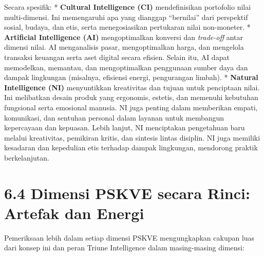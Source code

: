 \documentclass[
  letterpaper,
  DIV=11,
  numbers=noendperiod]{scrreprt}
\begin{document}
Secara spesifik: * \textbf{Cultural Intelligence (CI)} mendefinisikan
portofolio nilai multi-dimensi. Ini memengaruhi apa yang dianggap
``bernilai'' dari perspektif sosial, budaya, dan etis, serta
menegosiasikan pertukaran nilai non-moneter. * \textbf{Artificial
Intelligence (AI)} mengoptimalkan konversi dan \emph{trade-off} antar
dimensi nilai. AI menganalisis pasar, mengoptimalkan harga, dan
mengelola transaksi keuangan serta aset digital secara efisien. Selain
itu, AI dapat memodelkan, memantau, dan mengoptimalkan penggunaan sumber
daya dan dampak lingkungan (misalnya, efisiensi energi, pengurangan
limbah). * \textbf{Natural Intelligence (NI)} menyuntikkan kreativitas
dan tujuan untuk penciptaan nilai. Ini melibatkan desain produk yang
ergonomis, estetis, dan memenuhi kebutuhan fungsional serta emosional
manusia. NI juga penting dalam memberikan empati, komunikasi, dan
sentuhan personal dalam layanan untuk membangun kepercayaan dan
kepuasan. Lebih lanjut, NI menciptakan pengetahuan baru melalui
kreativitas, pemikiran kritis, dan sintesis lintas disiplin. NI juga
memiliki kesadaran dan kepedulian etis terhadap dampak lingkungan,
mendorong praktik berkelanjutan.

\section{\texorpdfstring{\textbf{6.4 Dimensi PSKVE secara Rinci: Artefak
dan
Energi}}{6.4 Dimensi PSKVE secara Rinci: Artefak dan Energi}}\label{dimensi-pskve-secara-rinci-artefak-dan-energi}

Pemeriksaan lebih dalam setiap dimensi PSKVE mengungkapkan cakupan luas
dari konsep ini dan peran Triune Intelligence dalam masing-masing
dimensi:
\end{document}
